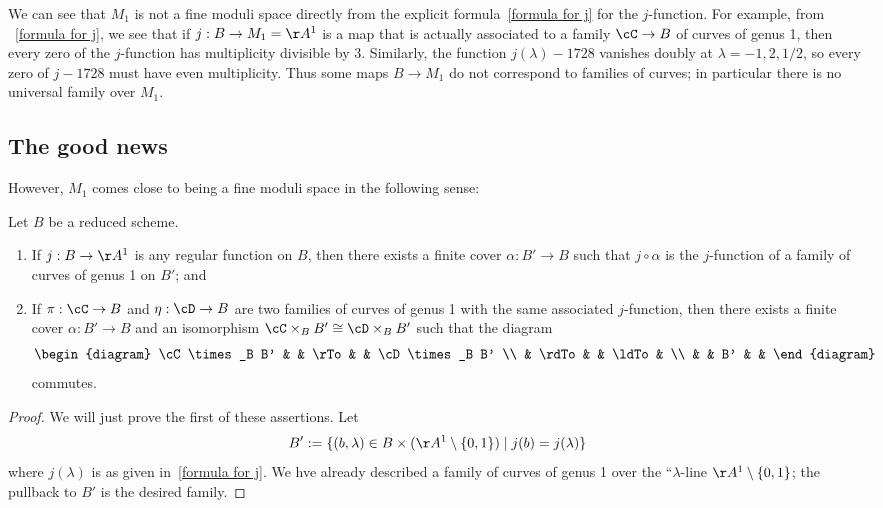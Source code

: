 We can see that $M_1$ is not a fine moduli space directly from the explicit formula~\ref{formula for j} for the $j$-function. For example, from ~\ref{formula for j}, we see that if $j : B \to M_1 = \AA^1$ is a map that is actually associated to a family $\cC \to B$ of curves of genus 1, then every zero of the $j$-function has multiplicity divisible by 3.  Similarly, the function $j(\lambda)-1728$ vanishes doubly at $\lambda = -1, 2, 1/2$, so every zero of $j - 1728$ must have even multiplicity. Thus some maps $B\to M_1$ do not correspond to families of curves; in particular there is no universal family over $M_1$. 

\subsection{The good news}

However, $M_1$ comes close to being a fine moduli space in the following sense:

\begin{proposition}\label{families on pullbacks} Let $B$ be a reduced scheme.
\begin{enumerate}
\item If $j : B \to \AA^1$ is any regular function on $B$, then there exists a finite cover $\alpha : B' \to B$ such that $j \circ \alpha$ is the $j$-function of a family of curves of genus 1 on $B'$; and
\item If $\pi : \cC \to B$ and $\eta : \cD \to B$ are two families of curves of genus 1 with the same associated $j$-function, then there exists a finite cover $\alpha : B' \to B$ and an isomorphism $\cC \times_B B' \cong \cD \times_B B'$ such that the diagram
$$
\begin{diagram}
\cC \times_B B' & & \rTo & & \cD \times_B B' \\
& \rdTo & & \ldTo & \\
& & B' & &
\end{diagram} 
$$
commutes.
\end{enumerate}
\end{proposition}

\begin{proof} 
We will just prove the first of these assertions. Let
$$
B' := \{(b, \lambda) \in B \times (\AA^1 \setminus \{0,1\}) \mid j(b) = j(\lambda)\}
$$
where $j(\lambda)$ is as given in~\ref{formula for j}. We hve already described a family of curves of genus 1 over the ``$\lambda$-line $\AA^1 \setminus \{0,1\}$; the pullback to $B'$ is the desired family.
\end{proof}

